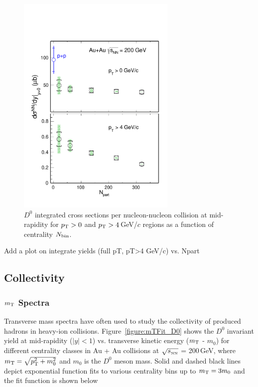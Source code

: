 \begin{figure}
\centering
\includegraphics[width=0.68\textwidth]{figure/Run14_D0HFT/Xsection_D0.pdf}
\caption{$D^{0}$ integrated cross sections per nucleon-nucleon collision at mid-rapidity for $p_{\rm T}>0$ and $p_{\rm T}>4$\,GeV/$c$ regions as a function of centrality $N_{\rm bin}$.}
\label{figure:Xsection_D0} 
\end{figure}

Add a plot on integrate yields (full pT, pT>4 GeV/c) vs. Npart

\subsection{\label{result:collectivity}Collectivity}

\subsubsection{\label{result:collectivity:mT}$m_{\rm T}$ Spectra}

Transverse mass spectra have often used to study the collectivity of produced hadrons in heavy-ion collisions. Figure~\ref{figure:mTFit_D0} shows the $D^{0}$ invariant yield at mid-rapidity ($|y|<1$) vs. transverse kinetic energy ($m_{\rm T}$ - $m_{0}$) for different centrality classes in Au + Au collisions at $\sqrt{s_{_{\rm NN}}}$ = 200\,GeV, where $m_{\rm T} = \sqrt{p_{\rm T}^2+m_0^2}$ and $m_0$ is the $D^0$ meson mass. Solid and dashed black lines depict exponential function fits to various centrality bins up to $m_{\rm T} = 3m_{0}$ and the fit function is shown below

